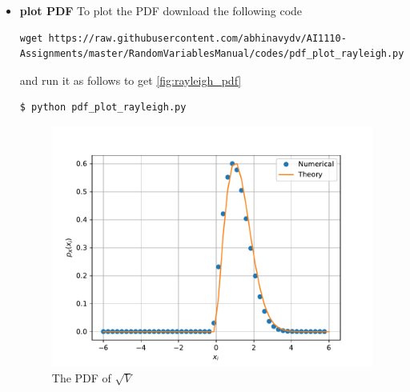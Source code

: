 \documentclass[journal,12pt,twocolumn]{IEEEtran}
\renewcommand\thesection{\arabic{section}}
\begin{document}
\begin{enumerate}[label=\thesection.\arabic*
        ,ref=\thesection.\theenumi]
\begin{itemize}
              \item \textbf{plot PDF}
                    To plot the PDF download the following code
                    \begin{lstlisting}
wget https://raw.githubusercontent.com/abhinavydv/AI1110-Assignments/master/RandomVariablesManual/codes/pdf_plot_rayleigh.py
\end{lstlisting}
                    and run it as follows to get \autoref{fig:rayleigh_pdf}
                    \begin{lstlisting}
$ python pdf_plot_rayleigh.py
\end{lstlisting}
                    \begin{figure}
                        \centering
                        \includegraphics[width=\columnwidth]{./figs/rayleigh_pdf}
                        \caption{The PDF of $\sqrt{V}$}
                        \label{fig:rayleigh_pdf}
                    \end{figure}

          \end{itemize}


\end{enumerate}
\end{document}
